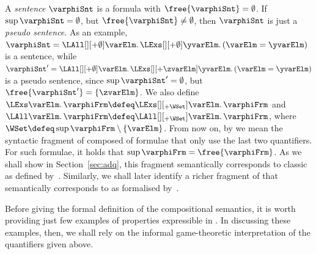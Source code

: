 \documentclass[authoryear]{elsarticle}
\begin{document}
%
A \emph{sentence} $\varphiSnt$ is a formula with $\free{\varphiSnt} =
\emptyset$.
If $\sup{\varphiSnt} = \emptyset$, but $\free{\varphiSnt} \neq \emptyset$, then
$\varphiSnt$ is just a \emph{pseudo sentence}.
As an example, $\varphiSnt = \LAll[][+\emptyset] \varElm \ldotp
\LExs[][+\emptyset] \yvarElm \ldotp (\varElm = \yvarElm)$ is a sentence, while
$\varphiSnt' = \LAll[][+\emptyset] \varElm \ldotp \LExs[][+\zvarElm] \yvarElm
\ldotp (\varElm = \yvarElm)$ is a pseudo sentence, since $\sup{\varphiSnt'} =
\emptyset$, but $\free{\varphiSnt'} = \{ \zvarElm \}$.
%
We also define $\LExs \varElm \ldotp \varphiFrm \defeq \LExs[][_{+\WSet}]
\varElm \ldotp \varphiFrm$ and $\LAll \varElm \ldotp \varphiFrm \defeq
\LAll[][_{+\WSet}] \varElm \ldotp \varphiFrm$, where $\WSet \defeq
\sup{\varphiFrm} \setminus \{ \varElm \}$.
From now on, by \FOL we mean the syntactic fragment of \ADIF composed of
formulae that only use the last two quantifiers.
For such formulae, it holds that $\sup{\varphiFrm} = \free{\varphiFrm}$.
As we shall show in Section~\ref{sec:adq}, this fragment semantically
corresponds to classic \FOL as defined by~\cite{Tar36}.
Similarly, we shall later identify a richer fragment of \ADIF that semantically
corresponds to \IF as formalised by~\cite{Hod97a}.

Before giving the formal definition of the compositional semantics, it is worth
providing just few examples of properties expressible in \ADIF.
In discussing these examples, then, we shall rely on the informal game-theoretic
interpretation of the quantifiers given above.
\end{document}
